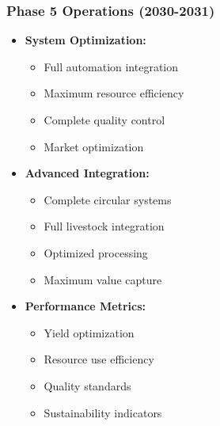 \subsubsection{Phase 5 Operations (2030-2031)}
\begin{itemize}
    \item \textbf{System Optimization:}
    \begin{itemize}
        \item Full automation integration
        \item Maximum resource efficiency
        \item Complete quality control
        \item Market optimization
    \end{itemize}
    \item \textbf{Advanced Integration:}
    \begin{itemize}
        \item Complete circular systems
        \item Full livestock integration
        \item Optimized processing
        \item Maximum value capture
    \end{itemize}
    \item \textbf{Performance Metrics:}
    \begin{itemize}
        \item Yield optimization
        \item Resource use efficiency
        \item Quality standards
        \item Sustainability indicators
    \end{itemize}
\end{itemize}

